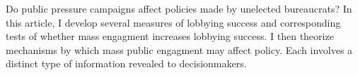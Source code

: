 Do public pressure campaigns affect policies made by unelected bureaucrats? In this article, I develop several measures of lobbying success and corresponding tests of whether mass engagment increases lobbying success. 
I then theorize mechanisms by which mass public engagment may affect policy. Each involves a distinct type of information revealed to decisionmakers. 

